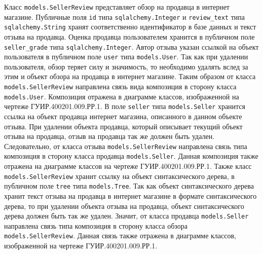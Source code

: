 Класс \texttt{mo\-dels.SellerReview} представляет обзор на продавца в интернет магазине. Публичные поля \texttt{id} типа \texttt{sqlalchemy.Integer} и \texttt{revi\-ew\_text} типа \texttt{sqlalchemy.String} хранят соответственно идентификатор в базе данных и текст отзыва на продавца. Оценка продавца пользователем хранится в публичном поле \texttt{seller\_grade} типа \texttt{sqlalchemy.Inte\-ger}. Автор отзыва указан ссылкой на объект пользователя в публичном поле \texttt{user} типа \texttt{mo\-dels.User}. Так как при удалении пользователя, обзор теряет силу и значимость, то необходимо удалять вслед за этим и объект обзора на продавца в интернет магазине. Таким образом от класса \texttt{mo\-dels.Sel\-ler\-Re\-vi\-ew} направлена связь вида композиция в сторону класса \texttt{mo\-dels.User}. Композиция отражена в диаграмме классов, изображенной на чертеже ГУИР.400201.009.РР.1. В поле \texttt{seller} типа \texttt{mo\-dels.Seller} хранится ссылка на объект продавца интернет магазина, описанного в данном объекте отзыва. При удалении объекта продавца, который описывает текущий объект отзыва на продавца, отзыв на продавца так же должен быть удален. Следовательно, от класса отзыва \texttt{mo\-dels.SellerReview} направлена связь типа композиция в сторону класса продавца \texttt{mo\-dels.Seller}. Данная композиция также отражена на диаграмме классов на чертеже ГУИР.400201.009.РР.1. Также класс \texttt{mo\-dels.SellerRevi\-ew} хранит ссылку на объект синтаксического дерева, в публичном поле \texttt{tree} типа \texttt{mo\-dels.Tree}. Так как объект синтаксического дерева хранит текст отзыва на продавца в интернет магазине в формате синтаксического дерева, то при удалении объекта отзыва на продавца, объект синтаксического дерева должен быть так же удален. Значит, от класса продавца \texttt{mo\-dels.Seller} направлена связь типа композиция в сторону класса обзора \texttt{mo\-dels.SellerReview}. Данная связь также отражена в диаграмме классов, изображенной на чертеже ГУИР.400201.009.РР.1.

